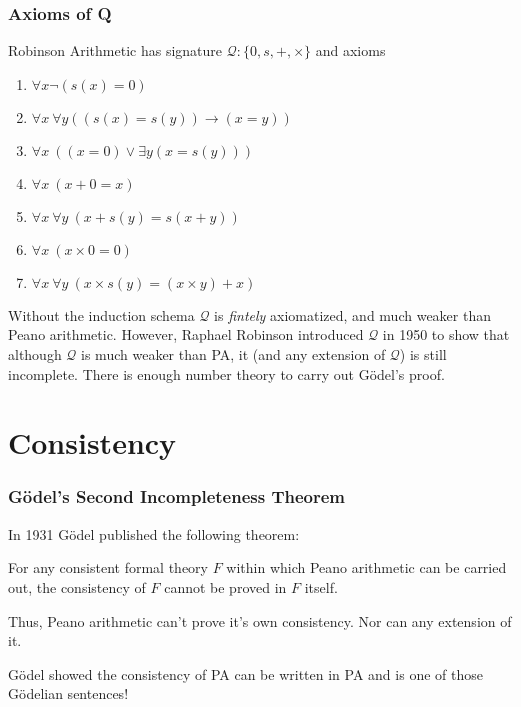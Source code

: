 \documentclass{beamer}
\begin{document}
\begin{frame}
	\frametitle{Axioms of Q}
	
	Robinson Arithmetic has signature $\mathcal{Q}: \{0,s,+,\times\}$ and axioms
	
	\begin{enumerate}
		\item $\forall x \lnot(s(x) = 0)$
		\item $\forall x \ \forall y ((s(x) = s(y)) \to (x = y))$
		\item $\forall x \ ((x = 0) \lor \exists y (x = s(y)))$
		\item $\forall x \ (x + 0 = x)$
		\item $\forall x \ \forall y \ (x + s(y) = s(x + y))$
		\item $\forall x \ (x \times 0 = 0)$
		\item $\forall x \ \forall y \ (x \times s(y) = (x \times y) + x)$
	\end{enumerate}
	
	\vspace{0.2cm}
	
	Without the induction schema $\mathcal{Q}$ is \emph{fintely} axiomatized, and much weaker than Peano arithmetic. However, Raphael Robinson introduced $\mathcal{Q}$ in 1950 to show that although $\mathcal{Q}$ is much weaker than PA, it (and any extension of $\mathcal{Q}$) is still incomplete. There is enough number theory to carry out G\"{o}del's proof. 
	
	
\end{frame}

\section{Consistency}

\begin{frame}
	\frametitle{G\"{o}del's Second Incompleteness Theorem}
	
	In 1931 G\"{o}del published the following theorem:
	
	\vspace{0.5cm}
	
	For any consistent formal theory $F$ within which Peano arithmetic can be carried out, the consistency of $F$ cannot be proved in $F$ itself. 
	
	\vspace{0.5cm} 
	
	Thus, Peano arithmetic can't prove it's own consistency. Nor can any extension of it. 
	
	\vspace{0.5cm} 
	
	G\"{o}del showed the consistency of PA can be written in PA and is one of those G\"{o}delian sentences!
	
\end{frame}
\end{document}
